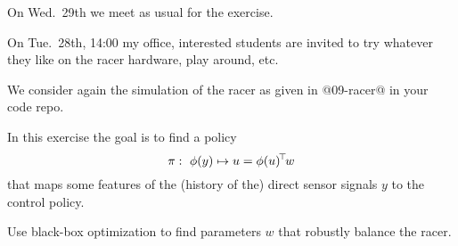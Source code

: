 

\renewcommand{\course}{Robotics}
\renewcommand{\coursepicture}{roboticsLecture}
\renewcommand{\coursedate}{Winter 2014}
\renewcommand{\exnum}{13}

\exercises


On Wed.\ 29th we meet as usual for the exercise.

On Tue.\ 28th, 14:00 my office, interested students are invited to try
whatever they like on the racer hardware, play around, etc.



We consider again the simulation of the racer as given in @09-racer@
in your code repo.

In this exercise the goal is to find a policy
$$\pi:~ \phi(y) \mapsto u = \phi(u)^{\!\top\!} w$$
that maps some features of the (history of the) direct sensor signals
$y$ to the control policy.

Use black-box optimization to find parameters $w$ that robustly
balance the racer.

